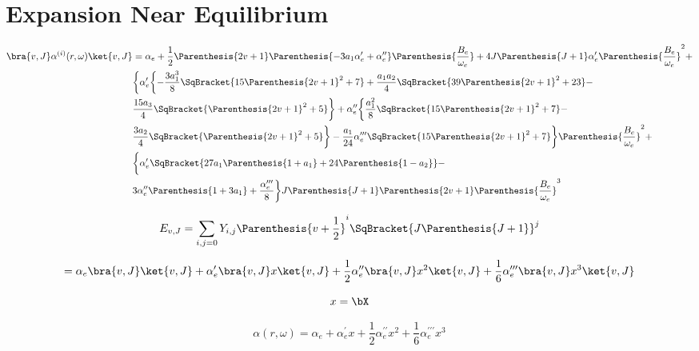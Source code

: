 \section{Expansion Near Equilibrium}
\begin{equation}
    \begin{split}
        \bra{v,J}\alpha^{(i)}(r,\omega)\ket{v,J} &= \alpha_e +
\frac{1}{2}\Parenthesis{2v + 1}\Parenthesis{-3a_1\alpha_e^{\prime} +
\alpha_e^{\prime\prime}}\Parenthesis{\frac{B_e}{\omega_e}} + 
        4J\Parenthesis{J+1}\alpha_e^{\prime}\Parenthesis{\frac{B_e}{\omega_e}}^2
        + \\
        & \biggl\{ \alpha_e^{\prime}\biggl\{
        -\frac{3a_1^3}{8}\SqBracket{15\Parenthesis{2v+1}^2+7} + 
        \frac{a_1a_2}{4}\SqBracket{39\Parenthesis{2v + 1}^2 + 23} - \\
        & \frac{15a_3}{4}\SqBracket{\Parenthesis{2v+1}^2+5}\biggr\} + 
    \alpha_e^{\prime\prime}\biggl\{
        \frac{a_1^2}{8}\SqBracket{15\Parenthesis{2v+1}^2 + 7} - \\      
        & \frac{3a_2}{4} \SqBracket{\Parenthesis{2v+1}^2 + 5} \biggr\} 
    -\frac{a_1}{24}\alpha_e^{\prime\prime\prime}\SqBracket{15\Parenthesis{2v+1}^2
        + 7}\biggr\}\Parenthesis{\frac{B_e}{\omega_e}}^2 + \\
    & \biggl\{ \alpha_e^{\prime}
        \SqBracket{27a_1\Parenthesis{1+a_1}+24\Parenthesis{1-a_2} } - \\
        & 3\alpha_e^{\prime\prime}\Parenthesis{1 + 3a_1} + 
        \frac{\alpha_e^{\prime\prime\prime}}{8} \biggr\} J\Parenthesis{J +
        1}\Parenthesis{2v +1}\Parenthesis{\frac{B_e}{\omega_e}}^3
    \end{split}
\end{equation}


\iffalse
$$ E_{v,J} = \sum_{i,j=0} Y_{i,j} \Parenthesis{v + \frac{1}{2}}^{i}
\SqBracket{J\Parenthesis{J+1}}^j $$

$$ = \alpha_e\bra{v,J}\ket{v,J} + \alpha_e^{\prime}\bra{v,J}x\ket{v,J} +
\frac{1}{2}\alpha_e^{\prime\prime}\bra{v,J}x^2\ket{v,J} +
\frac{1}{6}\alpha_e^{\prime\prime\prime}\bra{v,J}x^3\ket{v,J} $$

$$ x= \bX$$


\begin{equation}
        \alpha(r,\omega) = \alpha_e + \alpha_e^{\prime}x +
            \frac{1}{2}\alpha_e^{\prime\prime}x^2 +
            \frac{1}{6}\alpha_e^{\prime\prime\prime}x^3
\end{equation}




